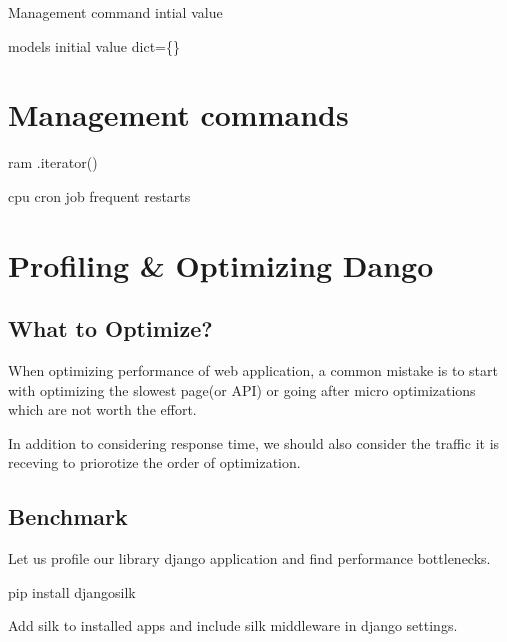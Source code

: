 \documentclass[letterpaper,11pt,english]{sphinxmanual}
\begin{document}
Management command
intial value

models initial value
dict=\{\}


\chapter{Management commands}
\label{\detokenize{misc_management_commands:management-commands}}\label{\detokenize{misc_management_commands::doc}}
ram
.iterator()

cpu
cron job
frequent restarts


\chapter{Profiling \& Optimizing Dango}
\label{\detokenize{misc_profiling:profiling-optimizing-dango}}\label{\detokenize{misc_profiling::doc}}

\section{What to Optimize?}
\label{\detokenize{misc_profiling:what-to-optimize}}
When optimizing performance of web application, a common mistake is to start with optimizing the slowest page(or API) or going after micro optimizations which are not worth the effort.

In addition to considering response time, we should also consider the traffic it is receving to priorotize the order of optimization.


\section{Benchmark}
\label{\detokenize{misc_profiling:benchmark}}
Let us profile our library django application and find performance bottlenecks.

\begin{sphinxVerbatim}[commandchars=\\\{\}]
pip install django\PYGZhy{}silk
\end{sphinxVerbatim}

Add silk to installed apps and include silk middleware in django settings.

\begin{sphinxVerbatim}[commandchars=\\\{\}]
  \PYG{p}{[}
\PYG{p}{]}

  
\end{sphinxVerbatim}
\end{document}
